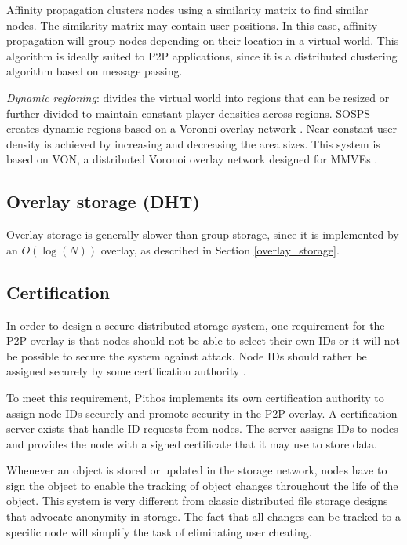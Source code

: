 Affinity propagation clusters nodes using a similarity matrix to find similar nodes. The similarity matrix may contain user positions. In this case, affinity propagation will group nodes depending on their location in a virtual world. This algorithm is ideally suited to P2P applications, since it is a distributed clustering algorithm based on message passing.

\emph{Dynamic regioning}: divides the virtual world into regions that can be resized or further divided to maintain constant player densities across regions. SOSPS creates dynamic regions based on a Voronoi overlay network \cite{voronoi_diagrams_survey}. Near constant user density is achieved by increasing and decreasing the area sizes. This system is based on VON, a distributed Voronoi overlay network designed for MMVEs \cite{VON_VAST}.

\subsection{Overlay storage (DHT)}

Overlay storage is generally slower than group storage, since it is implemented by an $O(\log (N))$ overlay, as described in Section \ref{overlay_storage}.

\subsection{Certification}
In order to design a secure distributed storage system, one requirement for the P2P overlay is that nodes should not be able to select their own IDs or it will not be possible to secure the system against attack. Node IDs should rather be assigned securely by some certification authority \cite{secure_overlay_routing}.

To meet this requirement, Pithos implements its own certification authority to assign node IDs securely and promote security in the P2P overlay. A certification server exists that handle ID requests from nodes. The server assigns IDs to nodes and provides the node with a signed certificate that it may use to store data.

Whenever an object is stored or updated in the storage network, nodes have to sign the object to enable the tracking of object changes throughout the life of the object. This system is very different from classic distributed file storage designs that advocate anonymity in storage. The fact that all changes can be tracked to a specific node will simplify the task of eliminating user cheating.

